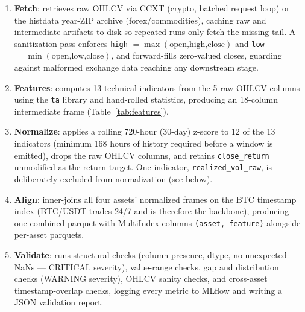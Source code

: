 \begin{enumerate}
    \item \textbf{Fetch}: retrieves raw OHLCV via CCXT (crypto, batched request loop) or the histdata year-ZIP archive (forex/commodities), caching raw and intermediate artifacts to disk so repeated runs only fetch the missing tail. A sanitization pass enforces \texttt{high} $=\max(\text{open,high,close})$ and \texttt{low} $=\min(\text{open,low,close})$, and forward-fills zero-valued closes, guarding against malformed exchange data reaching any downstream stage.
    \item \textbf{Features}: computes 13 technical indicators from the 5 raw OHLCV columns using the \texttt{ta} library and hand-rolled statistics, producing an 18-column intermediate frame (Table~\ref{tab:features}).
    \item \textbf{Normalize}: applies a rolling 720-hour (30-day) z-score to 12 of the 13 indicators (minimum 168 hours of history required before a window is emitted), drops the raw OHLCV columns, and retains \texttt{close\_return} unmodified as the return target. One indicator, \texttt{realized\_vol\_raw}, is deliberately excluded from normalization (see below).
    \item \textbf{Align}: inner-joins all four assets' normalized frames on the BTC timestamp index (BTC/USDT trades 24/7 and is therefore the backbone), producing one combined parquet with MultiIndex columns \texttt{(asset, feature)} alongside per-asset parquets.
    \item \textbf{Validate}: runs structural checks (column presence, dtype, no unexpected NaNs --- CRITICAL severity), value-range checks, gap and distribution checks (WARNING severity), OHLCV sanity checks, and cross-asset timestamp-overlap checks, logging every metric to MLflow and writing a JSON validation report.
\end{enumerate}


